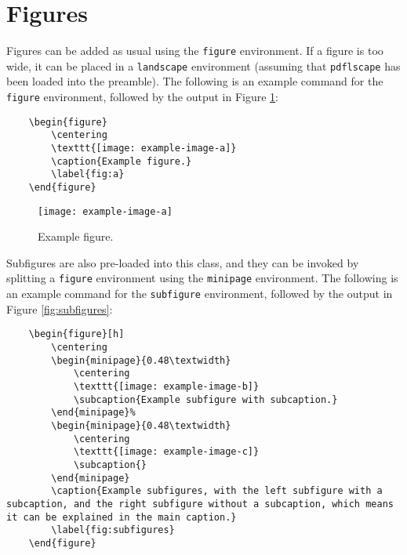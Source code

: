 \documentclass{umalayathesis}
\begin{document}
\section{Figures}

Figures can be added as usual using the \texttt{figure} environment. If a figure is too wide, it can be placed in a \texttt{landscape} environment (assuming that \texttt{pdflscape} has been loaded into the preamble). The following is an example command for the \texttt{figure} environment, followed by the output in Figure \ref{fig:figure}: 

\begin{verbatim}
    \begin{figure}
        \centering
        \texttt{[image: example-image-a]}
        \caption{Example figure.}
        \label{fig:a}
    \end{figure}
\end{verbatim}

\begin{figure}[h]
    \centering
    \texttt{[image: example-image-a]}
    \caption{Example figure.}
    \label{fig:figure}
\end{figure}

Subfigures are also pre-loaded into this class, and they can be invoked by splitting a \texttt{figure} environment using the \texttt{minipage} environment. The following is an example command for the \texttt{subfigure} environment, followed by the output in Figure \ref{fig:subfigures}:

\begin{verbatim}
    \begin{figure}[h]
        \centering
        \begin{minipage}{0.48\textwidth}
            \centering
            \texttt{[image: example-image-b]}
            \subcaption{Example subfigure with subcaption.}
        \end{minipage}%
        \begin{minipage}{0.48\textwidth}
            \centering
            \texttt{[image: example-image-c]}
            \subcaption{}
        \end{minipage}
        \caption{Example subfigures, with the left subfigure with a subcaption, and the right subfigure without a subcaption, which means it can be explained in the main caption.}
        \label{fig:subfigures}
    \end{figure}
\end{verbatim}
\end{document}
